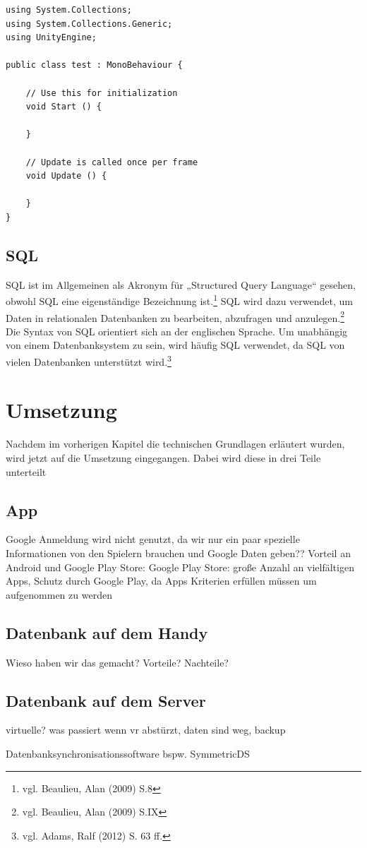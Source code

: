 \begin{scriptsize}
\lstset{
	float,
	caption=Aufbau eines Unity3D Skriptes, 
	language=[Sharp]C, 	
	frame=single,  
	showstringspaces=false, 
	showspaces=false, 
	numbers=left, 
	captionpos=b, 
	belowcaptionskip=4pt,
	basicstyle=\ttfamily
} 

\begin{lstlisting}[label=lst:unity3Dc]
using System.Collections;
using System.Collections.Generic;
using UnityEngine;

public class test : MonoBehaviour {

	// Use this for initialization
	void Start () {
		
	}
	
	// Update is called once per frame
	void Update () {
		
	}
}
\end{lstlisting}
\end{scriptsize}	

\section{SQL}

SQL ist im Allgemeinen als Akronym für „Structured Query Language“ gesehen, obwohl SQL eine eigenständige Bezeichnung ist.\footnote{vgl. Beaulieu, Alan\cite{sql1} (2009) S.8} SQL wird dazu verwendet, um Daten in relationalen Datenbanken zu bearbeiten, abzufragen und anzulegen.\footnote{vgl. Beaulieu, Alan\cite{sql1} (2009) S.IX} Die Syntax von SQL orientiert sich an der englischen Sprache. Um unabhängig von einem Datenbanksystem zu sein, wird häufig SQL verwendet, da SQL von vielen Datenbanken unterstützt wird.\footnote{vgl. Adams, Ralf\cite{sql2} (2012) S. 63 ff.}

\chapter{Umsetzung}

Nachdem im vorherigen Kapitel die technischen Grundlagen erläutert wurden, wird jetzt auf die Umsetzung eingegangen. Dabei wird diese in drei Teile unterteilt

\section{App}
Google Anmeldung wird nicht genutzt, da wir nur ein paar spezielle Informationen von den Spielern brauchen und Google Daten geben??
Vorteil an Android und Google Play Store: Google Play Store: große Anzahl an vielfältigen Apps, Schutz durch Google Play, da Apps Kriterien erfüllen müssen um aufgenommen zu werden

\section{Datenbank auf dem Handy}
Wieso haben wir das gemacht? Vorteile? Nachteile?
	
\section{Datenbank auf dem Server}
virtuelle? was passiert wenn vr abstürzt, daten sind weg, backup

Datenbanksynchronisationssoftware bspw. SymmetricDS